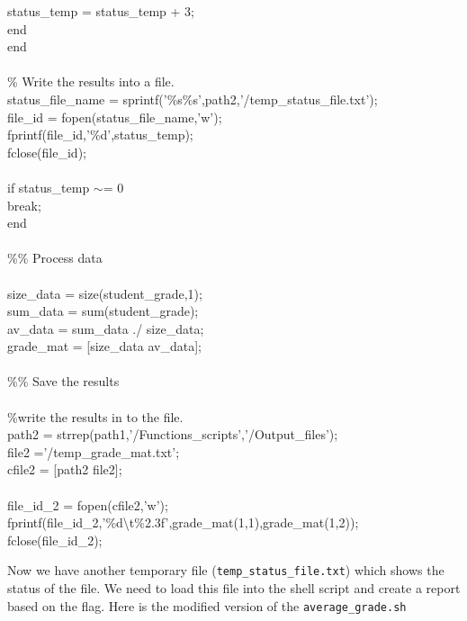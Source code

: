 \begin{mdframed}[hidealllines=true,backgroundcolor=gray!20]
\begin{singlespace}
{\phantom{x}\hspace{10ex} status\_temp = status\_temp + 3;\\
\phantom{x}\hspace{5ex} {\color{for_blue}end}\\
{\color{for_blue}end}\\
\\
{\color{matlab_green}\% Write the results into a file.}\\
status\_file\_name = sprintf({\color{matlab_pink}'\%s\%s'},path2,{\color{matlab_pink}'/temp\_status\_file.txt'});\\
file\_id = fopen(status\_file\_name,{\color{matlab_pink}'w'});\\
fprintf(file\_id,{\color{matlab_pink}'\%d'},status\_temp);\\
fclose(file\_id);\\
\\
{\color{for_blue}if} status\_temp $\sim$= 0\\
\phantom{x}\hspace{5ex} {\color{for_blue}break};\\
{\color{for_blue}end}\\
\\
{ \color{matlab_green}\%\% Process data}\\
\\
size\_data = size(student\_grade,1);\\
sum\_data = sum(student\_grade);\\
av\_data = sum\_data ./ size\_data;\\
grade\_mat = [size\_data av\_data];\\
\\
{ \color{matlab_green}\%\% Save the results}\\
\\
{ \color{matlab_green}\%write the results in to the file.} \\
path2 = strrep(path1,{\color{matlab_pink}'/Functions\_scripts'},{\color{matlab_pink}'/Output\_files'});\\ 
file2 ={\color{matlab_pink}'/temp\_grade\_mat.txt'};\\
cfile2 = [path2 file2];\\
\\
file\_id\_2 = fopen(cfile2,'w');\\
fprintf(file\_id\_2,{\color{matlab_pink}'\%d\textbackslash t\%2.3f'},grade\_mat(1,1),grade\_mat(1,2));\\
fclose(file\_id\_2);
}
\end{singlespace}
\end{mdframed}
\vspace{5mm}
\noindent
Now we have another temporary file (\texttt{temp\_status\_file.txt}) which shows the status of the file. We need to load this file into the shell script and create a report based on the flag. Here is the modified version of the \texttt{average\_grade.sh} 
\vspace{5mm}

